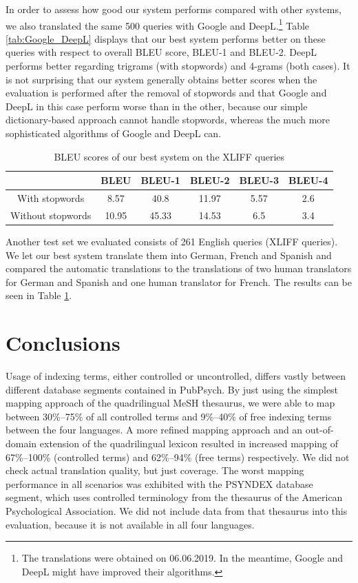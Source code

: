 \documentclass[a4paper,11pt]{article}
\begin{document}
In order to assess how good our system performs compared with other systems, we also translated the same 500 queries with Google and DeepL.\footnote{The translations were obtained on 06.06.2019. In the meantime, Google and DeepL might have improved their algorithms.} 
Table \ref{tab:Google_DeepL} displays that our best system performs better on these queries with respect to overall BLEU score, BLEU-1 and BLEU-2. DeepL performs better regarding trigrams (with stopwords) and 4-grams (both cases). It is not surprising that our system generally obtains better scores when the evaluation is performed after the removal of stopwords and that Google and DeepL in this case perform worse than in the other, because our simple dictionary-based approach cannot handle stopwords, whereas the much more sophisticated algorithms of Google and DeepL can.


\begin{table}[t]
	\begin{tabular}{c|c|c|c|c|c}
		&BLEU & BLEU-1 & BLEU-2 & BLEU-3 & BLEU-4\\
		\hline
		With stopwords & 8.57 & 40.8 & 11.97 & 5.57 & 2.6\\
		Without stopwords & 10.95 & 45.33 & 14.53 & 6.5 & 3.4\\
	\end{tabular}
	\caption{BLEU scores of our best system on the XLIFF queries}
	\label{tab:XLIFF}
\end{table}

Another test set we evaluated consists of 261 English queries (XLIFF queries). We let our best system translate them into German, French and Spanish and compared the automatic translations to the translations of two human translators for German and Spanish and one human translator for French. The results can be seen in Table \ref{tab:XLIFF}.

	\section{Conclusions}
	\label{s:conclusions}
	
	Usage of indexing terms, either controlled or uncontrolled, differs vastly between different database segments contained in PubPsych. By just using the simplest mapping approach of the quadrilingual MeSH thesaurus, we were able to map between 30\%--75\% of all controlled terms and 9\%--40\% of free indexing terms between the four languages. A more refined mapping approach and an out-of-domain extension of the quadrilingual lexicon resulted in increased mapping of 67\%--100\% (controlled terms) and 62\%--94\% (free terms) respectively. We did not check actual translation quality, but just coverage. The worst mapping performance in all scenarios was exhibited with the PSYNDEX database segment, which uses controlled terminology from the thesaurus of the American Psychological Association. We did not include data from that thesaurus into this evaluation, because it is not available in all four languages.
	
\end{document}
